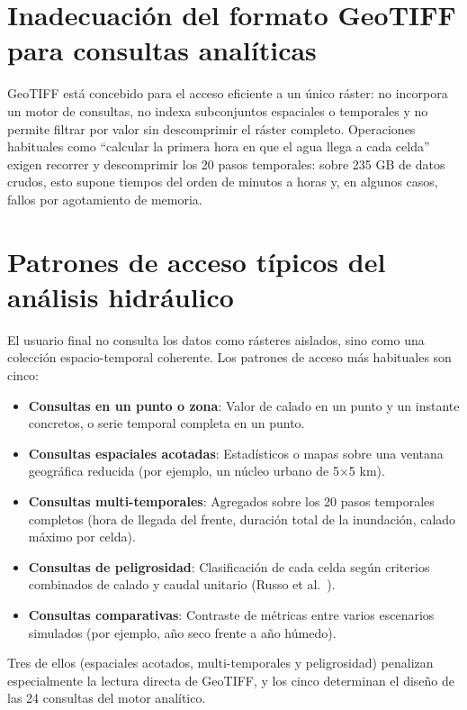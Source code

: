 \section{Inadecuación del formato GeoTIFF para consultas analíticas}\label{inadecuacion-geotiff}

GeoTIFF \cite{ogc_geotiff} está concebido para el acceso eficiente a un único ráster: no incorpora un motor de consultas, no indexa subconjuntos espaciales o temporales y no permite filtrar por valor sin descomprimir el ráster completo. Operaciones habituales como ``calcular la primera hora en que el agua llega a cada celda'' exigen recorrer y descomprimir los 20 pasos temporales: sobre 235 GB de datos crudos, esto supone tiempos del orden de minutos a horas y, en algunos casos, fallos por agotamiento de memoria.

\section{Patrones de acceso típicos del análisis hidráulico}\label{patrones-de-acceso}

El usuario final no consulta los datos como rásteres aislados, sino como una colección espacio-temporal coherente. Los patrones de acceso más habituales son cinco:

\begin{itemize}
\item \textbf{Consultas en un punto o zona}: Valor de calado en un punto y un instante concretos, o serie temporal completa en un punto.
\item \textbf{Consultas espaciales acotadas}: Estadísticos o mapas sobre una ventana geográfica reducida (por ejemplo, un núcleo urbano de 5$\times$5 km).
\item \textbf{Consultas multi-temporales}: Agregados sobre los 20 pasos temporales completos (hora de llegada del frente, duración total de la inundación, calado máximo por celda).
\item \textbf{Consultas de peligrosidad}: Clasificación de cada celda según criterios combinados de calado y caudal unitario (Russo et al.\ \cite{russo2013}).
\item \textbf{Consultas comparativas}: Contraste de métricas entre varios escenarios simulados (por ejemplo, año seco frente a año húmedo).
\end{itemize}

Tres de ellos (espaciales acotados, multi-temporales y peligrosidad) penalizan especialmente la lectura directa de GeoTIFF, y los cinco determinan el diseño de las 24 consultas del motor analítico.

